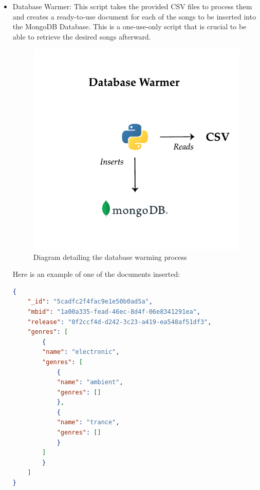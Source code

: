 \begin{itemize}
    \item Database Warmer: This script takes the provided CSV files to process them and creates a ready-to-use document for each of the songs to be inserted into the MongoDB Database. This is a one-use-only script that is crucial to be able to retrieve the desired songs afterward.
    \begin{figure}[th]
        \centering
        \includegraphics{Figures/DatabaseWarmer}
        \decoRule
        \caption[Database Warmer Script]{Diagram detailing the database warming process}
        \label{fig:Database Warmer Script}
    \end{figure}


    Here is an example of one of the documents inserted:
    \begin{lstlisting}[language=json, caption=Song JSON document]
{
    "_id": "5cadfc2f4fac9e1e50b0ad5a",
    "mbid": "1a00a335-fead-46ec-8d4f-06e8341291ea",
    "release": "0f2ccf4d-d242-3c23-a419-ea548af51df3",
    "genres": [
        {
        "name": "electronic",
        "genres": [
            {
            "name": "ambient",
            "genres": []
            },
            {
            "name": "trance",
            "genres": []
            }
        ]
        }
    ]
}
    \end{lstlisting}


\end{itemize}
